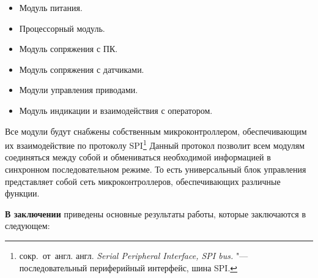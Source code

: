\begin{itemize}
\item Модуль питания.
\item Процессорный модуль.
\item Модуль сопряжения с ПК.
\item Модуль сопряжения с датчиками.
\item Модули управления приводами.
\item Модуль индикации и взаимодействия с оператором.
\end{itemize}

Все модули будут снабжены собственным микроконтроллером, обеспечивающим их взаимодействие по протоколу SPI\footnote{сокр.~от~англ. англ. \textit{Serial Peripheral Interface, SPI bus.} "--- последовательный периферийный интерфейс, шина SPI.} Данный протокол позволит всем модулям соединяться между собой и обмениваться необходимой информацией в синхронном последовательном режиме. То есть универсальный блок управления представляет собой сеть микроконтроллеров, обеспечивающих различные функции. 


\FloatBarrier                      
\textbf{В заключении} приведены основные результаты работы, которые заключаются в следующем:


